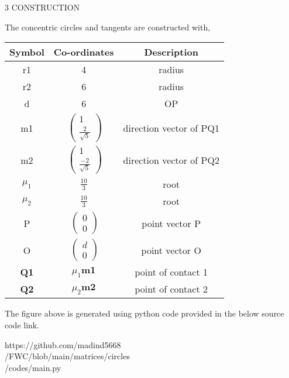 \documentclass[a4paper,10pt]{report}
\let\vec\mathbf
\begin{document}
\begin{multicols}{2}
\vspace{2mm}\\
\vspace{2mm}\\
\centering \large\textsc{3  C}\footnotesize\textsc{ONSTRUCTION}\vspace{5mm}\\
\raggedright\large{The concentric circles and tangents are constructed with,} 
\begin{center}
    \label{tab:truthtable}
    \setlength{\arrayrulewidth}{0.2mm}
\setlength{\tabcolsep}{5pt}
\renewcommand{\arraystretch}{1.25}
    \begin{tabular}{|c|c|c|}
    \hline %
      \large\textbf{Symbol} & \large\textbf{Co-ordinates} & \large\textbf{Description}\\
      \hline
       \large r1& 4& \large{radius}\\
       \large r2& 6& \large{radius}\\
       \large d & 6 & OP\\
	\large m1 & $\ \begin{pmatrix} 1\\\frac{2}{\sqrt{5}} \end{pmatrix}$ & \large direction vector of PQ1\\
	\large m2 & $\ \begin{pmatrix} 1\\\frac{-2}{\sqrt{5}} \end{pmatrix}$ & \large direction vector of PQ2\\
        \large$ \mu_1$ & $\frac{10}{3}$ & \large{root}\\
	\large $\mu_2$ & $\frac{10}{3}$ & \large{root}\\
        \large P & $\ \begin{pmatrix} 0\\0 \end{pmatrix}$ & \large point vector P\\
	\large O & $\ \begin{pmatrix} d\\0 \end{pmatrix}$ & \large point vector O\\
	\large \textbf{Q1} & $\mu_1\vec{m1}$ & point of contact 1\\
	\large \textbf{Q2} & $\mu_2\vec{m2}$ & point of contact 2\\
      \hline
   \end{tabular}
 \end{center}\vspace{5mm}
\raggedright\large{The figure above is generated using python code provided in the below source code link.}\vspace{2mm}\\
\begin{mdframed}
\raggedright\large{https://github.com/madind5668 \\ /FWC/blob/main/matrices/circles \\ /codes/main.py}
\end{mdframed}
\end{multicols}
\end{document}
